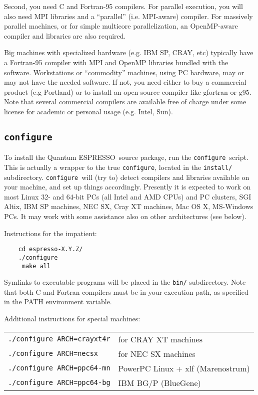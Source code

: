 \documentclass[12pt,a4paper]{article}
\def\qe{{\sc Quantum ESPRESSO}}
\def\configure{\texttt{configure}}
\begin{document}
Second, you need C and Fortran-95 compilers. For parallel 
execution, you will also need MPI libraries and a ``parallel''
(i.e. MPI-aware) compiler. For massively parallel machines, or 
for simple multicore parallelization, an OpenMP-aware compiler
and libraries are also required.

Big machines with
specialized hardware (e.g. IBM SP, CRAY, etc) typically have a
Fortran-95 compiler with MPI and OpenMP libraries bundled with 
the software. Workstations or ``commodity'' machines, using PC 
hardware, may or may not have the needed software. If not, you need 
either to buy a commercial product (e.g Portland) or to install
an open-source compiler like gfortran or g95. 
Note that several commercial compilers are available free of charge
under some license for academic or personal usage (e.g. Intel, Sun). 

\subsection{\configure}

To install the \qe\ source package, run the \configure{}ript. This is actually a wrapper to the true \configure,
located in the \texttt{install/} subdirectory. \configure\
will (try to) detect compilers and libraries available on
your machine, and set up things accordingly. Presently it is expected
to work on most Linux 32- and 64-bit PCs (all Intel and AMD CPUs) and PC clusters, SGI Altix, IBM SP  machines, NEC SX, Cray XT
machines, Mac OS X, MS-Windows PCs. It may work with
some assistance also on other architectures (see below). 

Instructions for the impatient:
\begin{verbatim}
    cd espresso-X.Y.Z/
    ./configure
     make all
\end{verbatim}
Symlinks to executable programs will be placed in the
\texttt{bin/}
subdirectory. Note that both C and Fortran compilers must be in your execution
path, as specified in the PATH environment variable.

Additional instructions for special machines:

\begin{tabular}{ll}
    \texttt{./configure ARCH=crayxt4r}& for CRAY XT machines \\
    \texttt{./configure ARCH=necsx}   & for NEC SX machines \\
    \texttt{./configure ARCH=ppc64-mn}& PowerPC Linux + xlf (Marenostrum) \\
    \texttt{./configure ARCH=ppc64-bg}& IBM BG/P (BlueGene)
\end{tabular}
    
\end{document}
